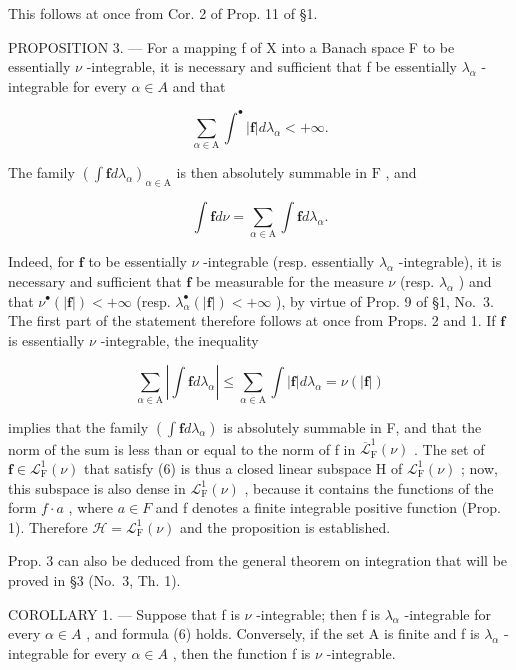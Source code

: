 This follows at once from Cor. 2 of Prop. 11 of §1.

PROPOSITION 3. --- For a mapping f of X into a Banach space F to be essentially \(\nu\) -integrable, it is necessary and sufficient that f be essentially \(\lambda_{\alpha}\) -integrable for every \(\alpha \in A\) and that

\[
\sum_ {\alpha \in \mathrm{A}} \int^ {\bullet} | \mathbf {f} | d \lambda_ {\alpha} <   + \infty .\tag{5}
\]

The family \((\int \mathbf{f}d\lambda_{\alpha})_{\alpha \in \mathrm{A}}\) is then absolutely summable in \(\mathrm{F}\) , and

\[
\int \mathbf {f} d \nu = \sum_ {\alpha \in \mathrm{A}} \int \mathbf {f} d \lambda_ {\alpha}.\tag{6}
\]

Indeed, for \(\mathbf{f}\) to be essentially \(\nu\) -integrable (resp. essentially \(\lambda_{\alpha}\) -integrable), it is necessary and sufficient that \(\mathbf{f}\) be measurable for the measure \(\nu\) (resp. \(\lambda_{\alpha}\) ) and that \(\nu^{\bullet}(|\mathbf{f}|) < +\infty\) (resp. \(\lambda_{\alpha}^{\bullet}(|\mathbf{f}|) < +\infty\) ), by virtue of Prop. 9 of §1, No.~3. The first part of the statement therefore follows at once from Props. 2 and 1. If \(\mathbf{f}\) is essentially \(\nu\) -integrable, the inequality

\[
\sum_ {\alpha \in \mathrm{A}} \left| \int \mathbf {f} d \lambda_ {\alpha} \right| \leqslant \sum_ {\alpha \in \mathrm{A}} \int | \mathbf {f} | d \lambda_ {\alpha} = \nu (| \mathbf {f} |)
\]

implies that the family \(\left(\int\mathbf{f}d\lambda_{\alpha}\right)\) is absolutely summable in F, and that the norm of the sum is less than or equal to the norm of f in \(\overline{\mathcal{L}}_{\mathrm{F}}^{1}(\nu)\) . The set of \(\mathbf{f}\in\mathcal{L}_{\mathrm{F}}^{1}(\nu)\) that satisfy (6) is thus a closed linear subspace H of \(\mathcal{L}_{\mathrm{F}}^{1}(\nu)\) ; now, this subspace is also dense in \(\mathcal{L}_{\mathrm{F}}^{1}(\nu)\) , because it contains the functions of the form \(f\cdot a\) , where \(a\in F\) and f denotes a finite integrable positive function (Prop. 1). Therefore \(\mathcal{H}=\mathcal{L}_{\mathrm{F}}^{1}(\nu)\) and the proposition is established.

Prop. 3 can also be deduced from the general theorem on integration that will be proved in §3 (No.~3, Th. 1).

COROLLARY 1. --- Suppose that f is \(\nu\) -integrable; then f is \(\lambda_{\alpha}\) -integrable for every \(\alpha \in A\) , and formula (6) holds. Conversely, if the set A is finite and f is \(\lambda_{\alpha}\) -integrable for every \(\alpha \in A\) , then the function f is \(\nu\) -integrable.

